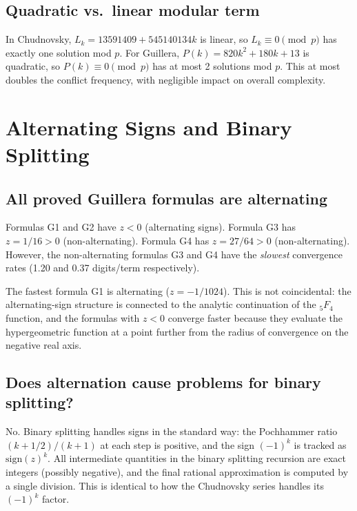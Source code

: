\documentclass[11pt]{article}
\begin{document}
\subsection{Quadratic vs.\ linear modular term}

In Chudnovsky, $L_k = 13591409 + 545140134k$ is linear, so $L_k \equiv 0 \pmod{p}$ has exactly one solution mod $p$. For Guillera, $P(k) = 820k^2 + 180k + 13$ is quadratic, so $P(k) \equiv 0 \pmod{p}$ has at most 2 solutions mod $p$. This at most doubles the conflict frequency, with negligible impact on overall complexity.

\section{Alternating Signs and Binary Splitting}
\label{sec:alternating}

\subsection{All proved Guillera formulas are alternating}

Formulas G1 and G2 have $z < 0$ (alternating signs). Formula G3 has $z = 1/16 > 0$ (non-alternating). Formula G4 has $z = 27/64 > 0$ (non-alternating). However, the non-alternating formulas G3 and G4 have the \emph{slowest} convergence rates (1.20 and 0.37 digits/term respectively).

The fastest formula G1 is alternating ($z = -1/1024$). This is not coincidental: the alternating-sign structure is connected to the analytic continuation of the ${}_5F_4$ function, and the formulas with $z < 0$ converge faster because they evaluate the hypergeometric function at a point further from the radius of convergence on the negative real axis.

\subsection{Does alternation cause problems for binary splitting?}

No. Binary splitting handles signs in the standard way: the Pochhammer ratio $(k+1/2)/(k+1)$ at each step is positive, and the sign $(-1)^k$ is tracked as $\text{sign}(z)^k$. All intermediate quantities in the binary splitting recursion are exact integers (possibly negative), and the final rational approximation is computed by a single division. This is identical to how the Chudnovsky series handles its $(-1)^k$ factor.
\end{document}
